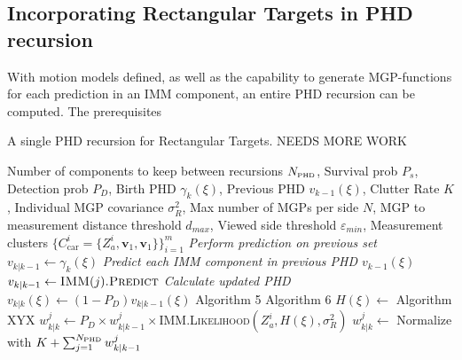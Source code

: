 \subsection{Incorporating Rectangular Targets in PHD recursion}

With motion models defined, as well as the capability to generate MGP-functions for each prediction in an IMM component, an entire PHD recursion can be computed. The prerequisites 

\begin{algorithm}[H]
\caption{A single PHD recursion for Rectangular Targets. NEEDS MORE WORK}\label{rectPHD}
\begin{algorithmic}
\Input 
Number of components to keep between recursions $N_{\text{\tiny{PHD}}}$, 
Survival prob $P_s$, 
Detection prob $P_D$,
Birth PHD $\gamma_k(\xi)$,
Previous PHD $v_{k-1}(\xi)$,
Clutter Rate $K$,
Individual MGP covariance $\sigma_R^2$,
Max number of MGPs per side $N$,
MGP to measurement distance threshold $d_{max}$,
Viewed side threshold $\varepsilon_{min}$,
Measurement clusters $\{C^i_{\text{car}}=\{Z_a^i,\mathbf{v}_1,\mathbf{v}_1\}\}_{i=1}^m$
\State 
\State \textit{Perform prediction on previous set}
\State $v_{k|k-1} \leftarrow \gamma_k(\xi)$
\State \textit{Predict each IMM component in previous PHD $v_{k-1}(\xi)$}
\State $v_{k|k-1} \leftarrow \textsc{IMM}(j)\textsc{.Predict}$
\EndFor
\State \textit{Calculate updated PHD}
\State $v_{k|k}(\xi) \leftarrow (1-P_D)v_{k|k-1}(\xi)$
\State Algorithm 5
\State Algorithm 6
\State $H(\xi)\leftarrow$ Algorithm XYX
\State $w_{k|k}^j\leftarrow P_D\times w_{k|k-1}^j\times$\textsc{IMM.Likelihood}$(Z_a^i, H(\xi),\sigma_R^2)$
\EndFor
{}
\State $w_{k|k}^j\leftarrow$ Normalize with $K +\sum_{j=1}^{N_{\text{\tiny{PHD}}}}w_{k|k-1}^j$
\EndFor
\EndFor
{}
\end{algorithmic}
\end{algorithm}



















